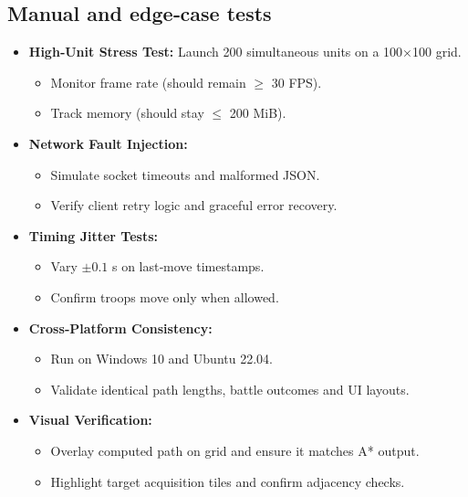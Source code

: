\documentclass[11pt,a4paper]{article}
\begin{document}
\subsection{Manual and edge‐case tests}
\begin{itemize}[nosep]
  \item \textbf{High‐Unit Stress Test:} Launch 200 simultaneous units on a 100×100 grid.  
    \begin{itemize}[nosep]
      \item Monitor frame rate (should remain $\ge$ 30 FPS).  
      \item Track memory (should stay $\le$ 200 MiB).  
    \end{itemize}
  \item \textbf{Network Fault Injection:}  
    \begin{itemize}[nosep]
      \item Simulate socket timeouts and malformed JSON.  
      \item Verify client retry logic and graceful error recovery.  
    \end{itemize}
  \item \textbf{Timing Jitter Tests:}  
    \begin{itemize}[nosep]
      \item Vary \(\pm0.1\) s on last‐move timestamps.  
      \item Confirm troops move only when allowed.  
    \end{itemize}
  \item \textbf{Cross‐Platform Consistency:}  
    \begin{itemize}[nosep]
      \item Run on Windows 10 and Ubuntu 22.04.  
      \item Validate identical path lengths, battle outcomes and UI layouts.  
    \end{itemize}
  \item \textbf{Visual Verification:}  
    \begin{itemize}[nosep]
      \item Overlay computed path on grid and ensure it matches A* output.  
      \item Highlight target acquisition tiles and confirm adjacency checks.  
    \end{itemize}
\end{itemize}
\end{document}
